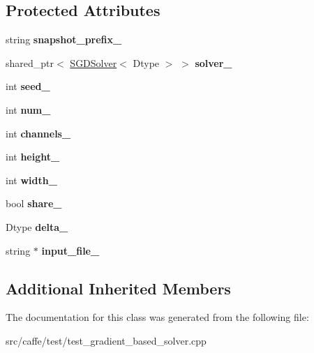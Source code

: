 \subsection*{Protected Attributes}
\begin{DoxyCompactItemize}
\item 
\mbox{\label{classcaffe_1_1_gradient_based_solver_test_a5610510dade22efa65d065081c099cbc}} 
string {\bfseries snapshot\+\_\+prefix\+\_\+}
\item 
\mbox{\label{classcaffe_1_1_gradient_based_solver_test_a33bd6f33358c8bcea3826cc5f09c139a}} 
shared\+\_\+ptr$<$ \mbox{\hyperlink{classcaffe_1_1_s_g_d_solver}{S\+G\+D\+Solver}}$<$ Dtype $>$ $>$ {\bfseries solver\+\_\+}
\item 
\mbox{\label{classcaffe_1_1_gradient_based_solver_test_ac71b2e895e3ca573d7292205fd1a25a3}} 
int {\bfseries seed\+\_\+}
\item 
\mbox{\label{classcaffe_1_1_gradient_based_solver_test_a84b19cc4631220ac8790cbc5afec5ac2}} 
int {\bfseries num\+\_\+}
\item 
\mbox{\label{classcaffe_1_1_gradient_based_solver_test_a44602b930f62febb3c2c13dbfe07a46e}} 
int {\bfseries channels\+\_\+}
\item 
\mbox{\label{classcaffe_1_1_gradient_based_solver_test_a11c43c781e8360f7f9fa7f8bedb6021f}} 
int {\bfseries height\+\_\+}
\item 
\mbox{\label{classcaffe_1_1_gradient_based_solver_test_afb5938b535a7169302c89b58786ff3d5}} 
int {\bfseries width\+\_\+}
\item 
\mbox{\label{classcaffe_1_1_gradient_based_solver_test_adaf3640d0810ae85d10cdce1caf1b47b}} 
bool {\bfseries share\+\_\+}
\item 
\mbox{\label{classcaffe_1_1_gradient_based_solver_test_a4b583aff0c7608520dc15ae0d7e5503a}} 
Dtype {\bfseries delta\+\_\+}
\item 
\mbox{\label{classcaffe_1_1_gradient_based_solver_test_a104e0b565e11e969d80c624f85da6106}} 
string $\ast$ {\bfseries input\+\_\+file\+\_\+}
\end{DoxyCompactItemize}
\subsection*{Additional Inherited Members}


The documentation for this class was generated from the following file\+:\begin{DoxyCompactItemize}
\item 
src/caffe/test/test\+\_\+gradient\+\_\+based\+\_\+solver.\+cpp\end{DoxyCompactItemize}
